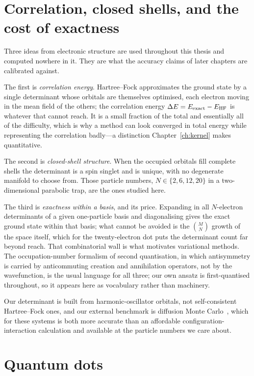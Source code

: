 \section{Correlation, closed shells, and the cost of exactness}
\label{sec:secondquant}
\label{sec:fci}

Three ideas from electronic structure are used throughout this thesis and computed nowhere in
it. They are what the accuracy claims of later chapters are calibrated against.

The first is \emph{correlation energy}. Hartree--Fock approximates the ground state by a
single determinant whose orbitals are themselves optimised, each electron moving in the mean
field of the others; the correlation energy $\Delta E=E_{\rm exact}-E_{\rm HF}$ is whatever
that cannot reach. It is a small fraction of the total and essentially all of the difficulty,
which is why a method can look converged in total energy while representing the correlation
badly---a distinction Chapter~\ref{ch:kernel} makes quantitative.

The second is \emph{closed-shell structure}. When the occupied orbitals fill complete shells
the determinant is a spin singlet and is unique, with no degenerate manifold to choose from.
Those particle numbers, $N\in\{2,6,12,20\}$ in a two-dimensional parabolic trap, are the ones
studied here.

The third is \emph{exactness within a basis}, and its price. Expanding in all $N$-electron
determinants of a given one-particle basis and diagonalising gives the exact ground state
within that basis; what cannot be avoided is the $\binom{M}{N}$ growth of the space itself,
which for the twenty-electron dot puts the determinant count far beyond reach. That
combinatorial wall is what motivates variational methods. The occupation-number formalism of
second quantisation, in which antisymmetry is carried by anticommuting creation and
annihilation operators, not by the wavefunction, is the usual language for all three;
our own ansatz is first-quantised throughout, so it appears here as vocabulary rather than
machinery.

Our determinant is built from harmonic-oscillator orbitals, not self-consistent
Hartree--Fock ones, and our external benchmark is diffusion Monte
Carlo~\cite{Pederiva2000-QD-DMC}, which for these systems is both more accurate than an
affordable configuration-interaction calculation and available at the particle numbers we
care about.

\section{Quantum dots}
\label{sec:quantumdots}


